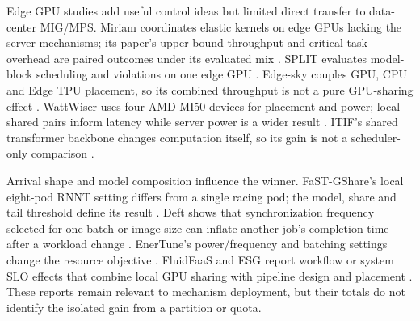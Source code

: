 \documentclass[12pt,a4paper]{article}
\begin{document}
Edge GPU studies add useful control ideas but limited direct transfer to data-center MIG/MPS. Miriam coordinates elastic kernels on edge GPUs lacking the server mechanisms; its paper's upper-bound throughput and critical-task overhead are paired outcomes under its evaluated mix \cite{miriam}. SPLIT evaluates model-block scheduling and violations on one edge GPU \cite{split}. Edge-sky couples GPU, CPU and Edge TPU placement, so its combined throughput is not a pure GPU-sharing effect \cite{edge_sky}. WattWiser uses four AMD MI50 devices for placement and power; local shared pairs inform latency while server power is a wider result \cite{wattwiser}. ITIF's shared transformer backbone changes computation itself, so its gain is not a scheduler-only comparison \cite{itif}.

Arrival shape and model composition influence the winner. FaST-GShare's local eight-pod RNNT setting differs from a single racing pod; the model, share and tail threshold define its result \cite{fastgshare}. Deft shows that synchronization frequency selected for one batch or image size can inflate another job's completion time after a workload change \cite{deft}. EnerTune's power/frequency and batching settings change the resource objective \cite{enertune}. FluidFaaS and ESG report workflow or system SLO effects that combine local GPU sharing with pipeline design and placement \cite{fluidfaas,esg}. These reports remain relevant to mechanism deployment, but their totals do not identify the isolated gain from a partition or quota.


\end{document}

